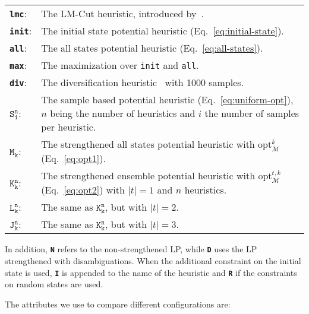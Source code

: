 \begin{center}
    \begin{tabularx}{\textwidth}{@{}lX@{}}
        \textbf{\texttt{lmc}}: & The LM-Cut heuristic, introduced by~\cite{helmert-domshlak-icaps2009}. \\
        \textbf{\texttt{init}}: & The initial state potential heuristic (Eq.~\eqref{eq:initial-state}). \\
        \textbf{\texttt{all}}: & The all states potential heuristic (Eq.~\eqref{eq:all-states}). \\
        \textbf{\texttt{max}}: & The maximization over \texttt{init} and \texttt{all}. \\ %
        \textbf{\texttt{div}}: & The diversification heuristic~\citep{seipp2015new} with 1000 samples. \\
        \textbf{$\texttt{S}_\texttt{i}^\texttt{n}$}: & The sample based potential heuristic (Eq.~\eqref{eq:uniform-opt}), $n$ being the number of heuristics and $i$ the number of samples per heuristic. \\ %
        \textbf{$\texttt{M}_\texttt{k}$}: & The strengthened all states potential heuristic with $\mathrm{opt}^k_\mathcal{M}$ (Eq.~\eqref{eq:opt1}). \\
        \textbf{$\texttt{K}_\texttt{k}^\texttt{n}$}: & The strengthened ensemble potential heuristic with $\mathrm{opt}^{t,k}_\mathcal{M}$ (Eq.~\eqref{eq:opt2}) with $|t|=1$ and $n$ heuristics. \\
        \textbf{$\texttt{L}_\texttt{k}^\texttt{n}$}: & The same as $\texttt{K}_\texttt{k}^\texttt{n}$, but with $|t|=2$. \\
        \textbf{$\texttt{J}_\texttt{k}^\texttt{n}$}: & The same as $\texttt{K}_\texttt{k}^\texttt{n}$, but with $|t|=3$. \\
    \end{tabularx}
\end{center}

In addition, \textbf{\texttt{N}} refers to the non-strengthened LP, while \textbf{\texttt{D}} uses the LP strengthened with disambiguations.
When the additional constraint on the initial state is used, \textbf{\texttt{I}} is appended to the name of the heuristic and \textbf{\texttt{R}} if the constraints on random states are used.

The attributes we use to compare different configurations are:

